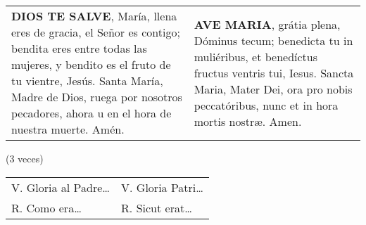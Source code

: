 \documentclass[./rosary.tex]{subfiles}
\begin{document}
\label{sec:hailMary}
\begin{longtable} { p{} p{} }
    \textbf{DIOS TE SALVE}, María, llena eres de gracia, el Señor es contigo; bendita eres entre todas las mujeres,
    y bendito es el fruto de tu vientre, Jesús. Santa María, Madre de Dios, ruega por nosotros pecadores,
    ahora u en el hora de nuestra muerte. Amén.

     &

    \textbf{AVE MARIA}, grátia plena, Dóminus tecum; benedicta tu in muliéribus, et benedíctus fructus ventris tui,
    Iesus. Sancta Maria, Mater Dei, ora pro nobis peccatóribus, nunc et in hora mortis nostræ. Amen.
\end{longtable}

\begin{flushright}
    (3 veces)
\end{flushright}


\begin{longtable} { p{} p{} }
    V. Gloria al Padre{\ldots} & V. Gloria Patri{\ldots} \\
    R. Como era{\ldots}        & R. Sicut erat{\ldots}   \\
\end{longtable}
\end{document}
